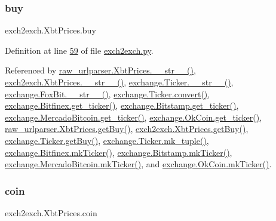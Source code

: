 \subsubsection{\texorpdfstring{buy}{buy}}
{\footnotesize\ttfamily exch2exch.\+Xbt\+Prices.\+buy}



Definition at line \hyperlink{exch2exch_8py_source_l00059}{59} of file \hyperlink{exch2exch_8py_source}{exch2exch.\+py}.



Referenced by \hyperlink{raw__urlparser_8py_source_l00074}{raw\+\_\+urlparser.\+Xbt\+Prices.\+\_\+\+\_\+str\+\_\+\+\_\+()}, \hyperlink{exch2exch_8py_source_l00091}{exch2exch.\+Xbt\+Prices.\+\_\+\+\_\+str\+\_\+\+\_\+()}, \hyperlink{exchange_8py_source_l00136}{exchange.\+Ticker.\+\_\+\+\_\+str\+\_\+\+\_\+()}, \hyperlink{exchange_8py_source_l00610}{exchange.\+Fox\+Bit.\+\_\+\+\_\+str\+\_\+\+\_\+()}, \hyperlink{exchange_8py_source_l00069}{exchange.\+Ticker.\+convert()}, \hyperlink{exchange_8py_source_l00439}{exchange.\+Bitfinex.\+get\+\_\+ticker()}, \hyperlink{exchange_8py_source_l00511}{exchange.\+Bitstamp.\+get\+\_\+ticker()}, \hyperlink{exchange_8py_source_l00651}{exchange.\+Mercado\+Bitcoin.\+get\+\_\+ticker()}, \hyperlink{exchange_8py_source_l00716}{exchange.\+Ok\+Coin.\+get\+\_\+ticker()}, \hyperlink{raw__urlparser_8py_source_l00062}{raw\+\_\+urlparser.\+Xbt\+Prices.\+get\+Buy()}, \hyperlink{exch2exch_8py_source_l00070}{exch2exch.\+Xbt\+Prices.\+get\+Buy()}, \hyperlink{exchange_8py_source_l00100}{exchange.\+Ticker.\+get\+Buy()}, \hyperlink{exchange_8py_source_l00121}{exchange.\+Ticker.\+mk\+\_\+tuple()}, \hyperlink{exchange_8py_source_l00453}{exchange.\+Bitfinex.\+mk\+Ticker()}, \hyperlink{exchange_8py_source_l00525}{exchange.\+Bitstamp.\+mk\+Ticker()}, \hyperlink{exchange_8py_source_l00665}{exchange.\+Mercado\+Bitcoin.\+mk\+Ticker()}, and \hyperlink{exchange_8py_source_l00730}{exchange.\+Ok\+Coin.\+mk\+Ticker()}.

\mbox{\label{classexch2exch_1_1_xbt_prices_a1191c8825e8f1333b4100b89fa2be053}} 
\subsubsection{\texorpdfstring{coin}{coin}}
{\footnotesize\ttfamily exch2exch.\+Xbt\+Prices.\+coin}



